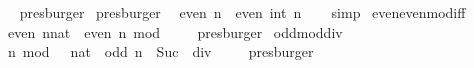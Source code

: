 \begin{isabellebody}
%
\isadelimproof
\ \ %
\endisadelimproof
%
\isatagproof
{}\isamarkupfalse%
\ presburger%
\endisatagproof
{\isafoldproof}%
%
\isadelimproof
\isanewline
%
\endisadelimproof
\isanewline
{}\isamarkupfalse%
\ {\isacharbrackleft}{\kern0pt}presburger{\isacharbrackright}{\kern0pt}{\isacharcolon}{\kern0pt}\isanewline
\ \ {\isachardoublequoteopen}even\ n\ {\isasymlongleftrightarrow}\ even\ {\isacharparenleft}{\kern0pt}int\ n{\isacharparenright}{\kern0pt}{\isachardoublequoteclose}\isanewline
%
\isadelimproof
\ \ %
\endisadelimproof
%
\isatagproof
{}\isamarkupfalse%
\ simp%
\endisatagproof
{\isafoldproof}%
%
\isadelimproof
%
\endisadelimproof
%
\isadelimdocument
%
\endisadelimdocument
%
\isatagdocument
%
\isamarkuptrue%
%
\endisatagdocument
{\isafolddocument}%
%
\isadelimdocument
%
\endisadelimdocument
{}\isamarkupfalse%
\ even{\isacharunderscore}{\kern0pt}even{\isacharunderscore}{\kern0pt}mod{\isacharunderscore}{\kern0pt}{}{\isacharunderscore}{\kern0pt}iff{\isacharcolon}{\kern0pt}\isanewline
\ \ {\isachardoublequoteopen}even\ {\isacharparenleft}{\kern0pt}n{\isacharcolon}{\kern0pt}{\isacharcolon}{\kern0pt}nat{\isacharparenright}{\kern0pt}\ {\isasymlongleftrightarrow}\ even\ {\isacharparenleft}{\kern0pt}n\ mod\ {}{\isacharparenright}{\kern0pt}{\isachardoublequoteclose}\isanewline
%
\isadelimproof
\ \ %
\endisadelimproof
%
\isatagproof
{}\isamarkupfalse%
\ presburger%
\endisatagproof
{\isafoldproof}%
%
\isadelimproof
\isanewline
%
\endisadelimproof
\isanewline
{}\isamarkupfalse%
\ odd{\isacharunderscore}{\kern0pt}mod{\isacharunderscore}{\kern0pt}{}{\isacharunderscore}{\kern0pt}div{\isacharunderscore}{\kern0pt}{}{\isacharcolon}{\kern0pt}\isanewline
\ \ {\isachardoublequoteopen}n\ mod\ {}\ {\isacharequal}{\kern0pt}\ {\isacharparenleft}{\kern0pt}{}{\isacharcolon}{\kern0pt}{\isacharcolon}{\kern0pt}nat{\isacharparenright}{\kern0pt}\ {\isasymLongrightarrow}\ odd\ {\isacharparenleft}{\kern0pt}{\isacharparenleft}{\kern0pt}n\ {\isacharminus}{\kern0pt}\ Suc\ {}{\isacharparenright}{\kern0pt}\ div\ {}{\isacharparenright}{\kern0pt}{\isachardoublequoteclose}\isanewline
%
\isadelimproof
\ \ %
\endisadelimproof
%
\isatagproof
{}\isamarkupfalse%
\ presburger%
\endisatagproof
{\isafoldproof}%
%
\isadelimproof
\isanewline
%
\endisadelimproof
\isanewline

\end{isabellebody}
